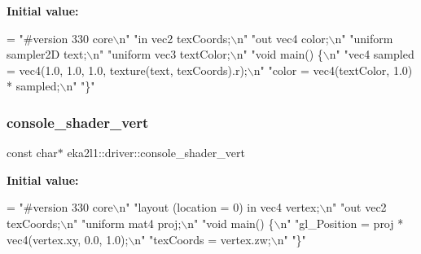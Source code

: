 {\bfseries Initial value\+:}
\begin{DoxyCode}
= \textcolor{stringliteral}{"#version 330 core\(\backslash\)n"}
            \textcolor{stringliteral}{"in vec2 texCoords;\(\backslash\)n"}
            \textcolor{stringliteral}{"out vec4 color;\(\backslash\)n"}
            \textcolor{stringliteral}{"uniform sampler2D text;\(\backslash\)n"}
            \textcolor{stringliteral}{"uniform vec3 textColor;\(\backslash\)n"}
            \textcolor{stringliteral}{"void main() \{\(\backslash\)n"}
            \textcolor{stringliteral}{"vec4 sampled = vec4(1.0, 1.0, 1.0, texture(text, texCoords).r);\(\backslash\)n"}
            \textcolor{stringliteral}{"color = vec4(textColor, 1.0) * sampled;\(\backslash\)n"}
            \textcolor{stringliteral}{"\}"}
\end{DoxyCode}
\mbox{\label{namespaceeka2l1_1_1driver_a3dd1af4e214c2662e3b27317b7a984b8}} 
\subsubsection{\texorpdfstring{console\+\_\+shader\+\_\+vert}{console\_shader\_vert}}
{\footnotesize\ttfamily const char$\ast$ eka2l1\+::driver\+::console\+\_\+shader\+\_\+vert}

{\bfseries Initial value\+:}
\begin{DoxyCode}
= \textcolor{stringliteral}{"#version 330 core\(\backslash\)n"}
            \textcolor{stringliteral}{"layout (location = 0) in vec4 vertex;\(\backslash\)n"}
            \textcolor{stringliteral}{"out vec2 texCoords;\(\backslash\)n"}
            \textcolor{stringliteral}{"uniform mat4 proj;\(\backslash\)n"}
            \textcolor{stringliteral}{"void main() \{\(\backslash\)n"}
            \textcolor{stringliteral}{"gl\_Position = proj * vec4(vertex.xy, 0.0, 1.0);\(\backslash\)n"}
            \textcolor{stringliteral}{"texCoords = vertex.zw;\(\backslash\)n"}
            \textcolor{stringliteral}{"\}"}
\end{DoxyCode}
\mbox{\label{namespaceeka2l1_1_1driver_acbb3ed05193e132a83c55cdc822a1dfb}} 
